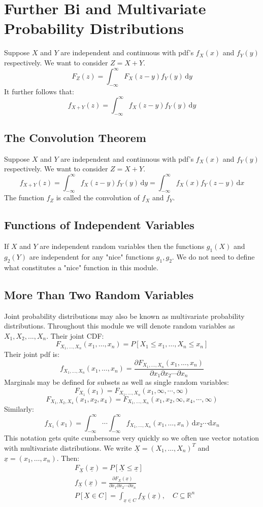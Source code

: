 \documentclass[12pt]{article}
\newcommand{\pf}[2]{\frac{\partial #1}{\partial #2}}
\begin{document}
\section{Further Bi and Multivariate Probability Distributions}
Suppose \(X\) and \(Y\) are independent and continuous with pdf's \(f_X(x)\) and \(f_Y(y)\) respectively. We want  to consider \(Z=X+Y\).
\[F_Z(z)=\int^\infty_{-\infty}F_X(z-y)f_Y(y)\,\text{d}y\]
It further follows that:
\[f_{X+Y}(z)=\int^\infty_{-\infty}f_X(z-y)f_Y(y)\,\text{d}y\]
\subsection{The Convolution Theorem}
Suppose \(X\) and \(Y\) are independent and continuous with pdf's \(f_X(x)\) and \(f_Y(y)\) respectively. We want  to consider \(Z=X+Y\).
\[f_{X+Y}(z)=\int^\infty_{-\infty}f_X(z-y)f_Y(y)\,\text{d}y=\int^\infty_{-\infty}f_X(x)f_Y(z-y)\,\text{d}x\]
The function \(f_Z\) is called the convolution of \(f_X\) and \(f_Y\).
\subsection{Functions of Independent Variables}
If \(X\) and \(Y\) are independent random variables then the functions \(g_1(X)\) and \(g_2(Y)\) are independent for any "nice" functions \(g_1,g_2\). We do not need to define what constitutes a "nice" function in this module.
\subsection{More Than Two Random Variables}
Joint probability distributions may also be known as multivariate probability distributions. Throughout this module we will denote random variables as \(X_1,X_2,...,X_n\). Their joint CDF:
\[F_{X_1,\dots,X_n}(x_1,\dots,x_n)=P[X_1\leq x_1,\dots,X_n\leq x_n]\]
Their joint pdf is:
\[f_{X_1,\dots,X_n}(x_1,\dots,x_n)=\pf{F_{X_1,\dots,X_n}(x_1,\dots,x_n)}{x_1\partial x_2\cdots \partial x_n}\]
Marginals may be defined for subsets as well as single random variables:
\[F_{X_1}(x_1)=F_{X_1,\dots, X_n}(x_1,\infty,\cdots,\infty)\]
\[F_{X_1,X_2,X_4}(x_1,x_2,x_4)=F_{X_1,\dots, X_n}(x_1,x_2,\infty,x_4,\cdots,\infty)\]
Similarly:
\[f_{X_1}(x_1)=\int^{\infty}_{-\infty}\cdots\int^\infty_{-\infty}f_{X_1,\dots,X_n}(x_1,\dots, x_n)\,\text{d}x_2\cdots\text{d}x_n\]
This notation gets quite cumbersome very quickly so we often use vector notation with multivariate distributions. We write \(\underline{X}=(X_1,\dots,X_n)^T\) and \(\underline{x}=(x_1,\dots,x_n)\). Then:
\begin{align*}
    &F_{\underline{X}}(\underline{x})=P[\underline{X}\leq \underline{x}] \\
    &f_{\underline{X}}(\underline{x})=\pf{F_{\underline{X}}(\underline{x})}{x_1\partial x_2\cdots \partial x_n} \\
    &P[\underline{X}\in C]=\int_{\underline{x}\in C}f_{\underline{X}}(\underline{x}),\quad C\subseteq \mathbb{R}^n
\end{align*}
\end{document}
